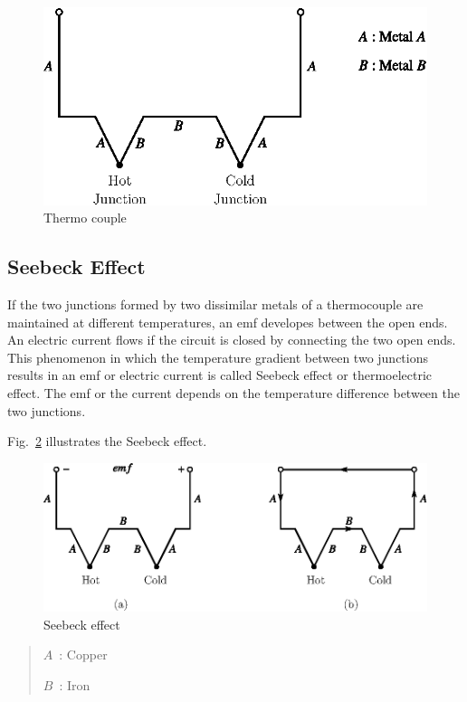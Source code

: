 \begin{figure}[H]
\centering
\includegraphics{chap8/fig8.19.eps}
\caption{Thermo couple}\label{fig8.19}
\end{figure}

\subsection{Seebeck Effect}\label{sec8.13.1}

If the two junctions formed by two dissimilar metals of a thermocouple are maintained at different temperatures, an emf developes between the open ends. An electric current flows if the circuit is closed by connecting the two open ends. This phenomenon in which the temperature gradient between two junctions results in an emf or electric current is called Seebeck effect or thermoelectric effect. The emf or the current depends on the temperature difference between the two junctions.

Fig.~\ref{fig8.20} illustrates the Seebeck effect.
\begin{figure}[H]
\centering
\includegraphics{chap8/fig8.20.eps}
\caption{Seebeck effect}\label{fig8.20}
\end{figure}
\begin{quote}
$A$~: Copper

$B$~: Iron
\end{quote}

